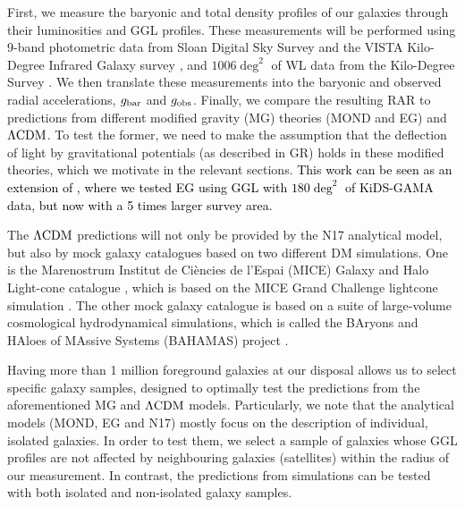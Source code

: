 \documentclass[usenatbib]{mnras}
\newcommand{\lcdm}{{\rm \Lambda CDM}}
\newcommand{\un}[1]{_{\rm #1}}
\begin{document}
First, we measure the baryonic and total density profiles of our galaxies through their luminosities and GGL profiles. These measurements will be performed using 9-band photometric data from Sloan Digital Sky Survey \cite[SDSS,]{abazajian2009} and the VISTA Kilo-Degree Infrared Galaxy survey \cite[VIKING]{edge2013}, and $1006 \deg^2$ of WL data from the Kilo-Degree Survey \textcolor{black}{\cite[KiDS-1000;][]{dejong2013,kuijken2019}}. We then translate these measurements into the baryonic and observed radial accelerations, $g\un{bar}$ and $g\un{obs}$. Finally, we compare the resulting RAR to predictions from different modified gravity (MG) theories (MOND and EG) and $\lcdm$. To test the former, we need to make the assumption that the deflection of light by gravitational potentials (as described in GR) holds in these modified theories, which we motivate in the relevant sections. \textcolor{black}{This work can be seen as an extension of \cite{brouwer2017}, where we tested EG using GGL with $180 \deg^2$ of KiDS-GAMA data, but now with a 5 times larger survey area.}

The $\lcdm$ predictions will not only be provided by the N17 analytical model, but also by mock galaxy catalogues based on two different DM simulations. One is the Marenostrum Institut de Ci{\`e}ncies de l'Espai (MICE) Galaxy and Halo Light-cone catalogue \cite[]{carretero2015,hoffmann2015}, which is based on the MICE Grand Challenge lightcone simulation \cite[MICE-GC,][]{fosalba2015a,fosalba2015b,crocce2015}. The other mock galaxy catalogue is based on a suite of large-volume cosmological hydrodynamical simulations, which is called the BAryons and HAloes of MAssive Systems (BAHAMAS) project \cite[]{mccarthy2017}.

Having more than 1 million foreground galaxies at our disposal allows us to select specific galaxy samples, designed to optimally test the predictions from the aforementioned MG and $\lcdm$ models. Particularly, we note that the analytical models (MOND, EG and N17) mostly focus on the description of individual, isolated galaxies. In order to test them, we select a sample of galaxies whose GGL profiles are not affected by neighbouring galaxies (satellites) within the radius of our measurement. In contrast, the predictions from simulations can be tested with both isolated and non-isolated galaxy samples.
\end{document}
